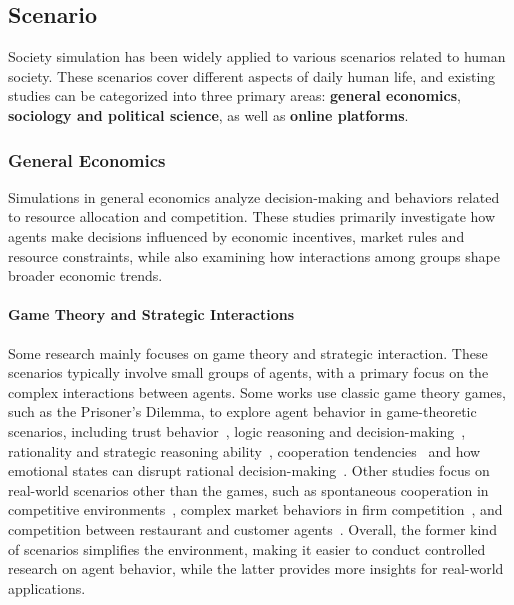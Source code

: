 \subsection{Scenario}
\label{subsec:soc_scenario}
Society simulation has been widely applied to various scenarios related to human society. These scenarios cover different aspects of daily human life, and existing studies can be categorized into three primary areas: \textbf{general economics}, \textbf{sociology and political science}, as well as \textbf{online platforms}. 

\subsubsection{General Economics}
Simulations in general economics analyze decision-making and behaviors related to resource allocation and competition. These studies primarily investigate how agents make decisions influenced by economic incentives, market rules and resource constraints, while also examining how interactions among groups shape broader economic trends.

\paragraph{Game Theory and Strategic Interactions}
Some research mainly focuses on game theory and strategic interaction. These scenarios typically involve small groups of agents, with a primary focus on the complex interactions between agents. Some works use classic game theory games, such as the Prisoner's Dilemma, to explore agent behavior in game-theoretic scenarios, including trust behavior~\cite{xie2024can}, logic reasoning and decision-making~\cite{mensfelt2024logic}, rationality and strategic reasoning ability~\cite{guo2024economics}, cooperation tendencies~\cite{fontana2024nicer} and how emotional states can disrupt rational decision-making~\cite{mozikov2024good}. Other studies focus on real-world scenarios other than the games, such as spontaneous cooperation in competitive environments~\cite{wu2024shall}, complex market behaviors in firm competition~\cite{han2023guinea}, and competition between restaurant and customer agents~\cite{zhaocompeteai}. Overall, the former kind of scenarios simplifies the environment, making it easier to conduct controlled research on agent behavior, while the latter provides more insights for real-world applications.

